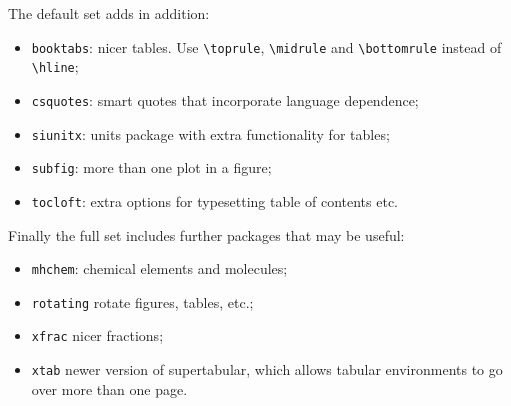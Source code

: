 \documentclass[atlasstyle,UKenglish]{latex/atlasdoc}
\newcommand{\Macro}[1]{\texttt{\textbackslash #1}\xspace}
\begin{document}
The default set adds in addition:
\begin{itemize}\setlength{\parskip}{0pt}\setlength{\itemsep}{0pt}
\item \texttt{booktabs}: nicer tables. Use \Macro{toprule}, \Macro{midrule} and \Macro{bottomrule} instead of \Macro{hline};
\item \texttt{csquotes}: smart quotes that incorporate language dependence;
\item \texttt{siunitx}: units package with extra functionality for tables;
\item \texttt{subfig}: more than one plot in a figure;
\item \texttt{tocloft}: extra options for typesetting table of contents etc.
\end{itemize}

Finally the full set includes further packages that may be useful:
\begin{itemize}\setlength{\parskip}{0pt}\setlength{\itemsep}{0pt}
\item \texttt{mhchem}: chemical elements and molecules;
\item \texttt{rotating} rotate figures, tables, etc.;
\item \texttt{xfrac} nicer fractions;
\item \texttt{xtab} newer version of supertabular, which allows tabular environments to go over more than one page.
\end{itemize}
\end{document}
